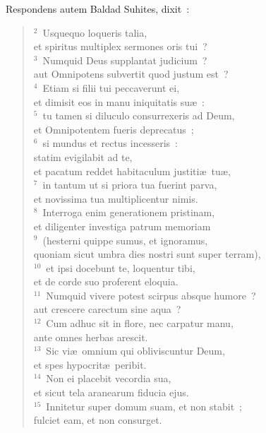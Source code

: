 \lettrine[lines=10,image=true,loversize=0.05,lraise=-0.03]{R}{}espondens autem Baldad Suhites, dixit~:
\begin{flushleft}\begin{verse}\vspace{6pt}${}^{2}$~Usquequo loqueris talia,\\ et spiritus multiplex sermones oris tui~?\\
${}^{3}$~Numquid Deus supplantat judicium~?\\ aut Omnipotens subvertit quod justum est~?\\
${}^{4}$~Etiam si filii tui peccaverunt ei,\\ et dimisit eos in manu iniquitatis su\ae~:\\
${}^{5}$~tu tamen si diluculo consurrexeris ad Deum,\\ et Omnipotentem fueris deprecatus~;\\
${}^{6}$~si mundus et rectus incesseris~:\\ statim evigilabit ad te,\\ et pacatum reddet habitaculum justiti\ae\ tu\ae ,\\
${}^{7}$~in tantum ut si priora tua fuerint parva,\\ et novissima tua multiplicentur nimis.\\
${}^{8}$~Interroga enim generationem pristinam,\\ et diligenter investiga patrum memoriam\\
${}^{9}$~(hesterni quippe sumus, et ignoramus,\\ quoniam sicut umbra dies nostri sunt super terram),\\
${}^{10}$~et ipsi docebunt te, loquentur tibi,\\ et de corde suo proferent eloquia.\\
${}^{11}$~Numquid vivere potest scirpus absque humore~?\\ aut crescere carectum sine aqua~?\\
${}^{12}$~Cum adhuc sit in flore, nec carpatur manu,\\ ante omnes herbas arescit.\\
${}^{13}$~Sic vi\ae\ omnium qui obliviscuntur Deum,\\ et spes hypocrit\ae\ peribit.\\
${}^{14}$~Non ei placebit vecordia sua,\\ et sicut tela aranearum fiducia ejus.\\
${}^{15}$~Innitetur super domum suam, et non stabit~;\\ fulciet eam, et non consurget.\\

\end{verse}
\end{flushleft}
